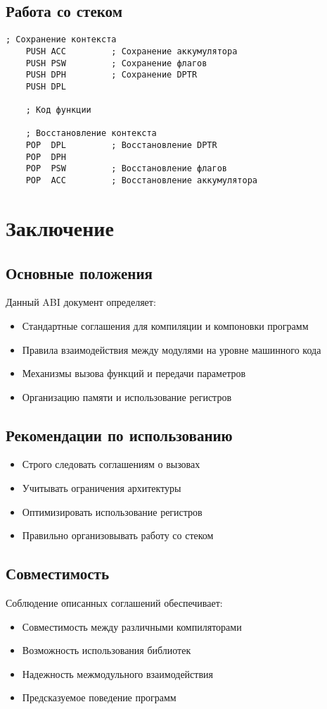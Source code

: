 \documentclass[a4paper, 12pt]{article}
\begin{document}
\subsection{Работа со стеком}
\begin{lstlisting}[language={mc51}]
    ; Сохранение контекста
    PUSH ACC         ; Сохранение аккумулятора
    PUSH PSW         ; Сохранение флагов
    PUSH DPH         ; Сохранение DPTR
    PUSH DPL
    
    ; Код функции
    
    ; Восстановление контекста
    POP  DPL         ; Восстановление DPTR
    POP  DPH
    POP  PSW         ; Восстановление флагов
    POP  ACC         ; Восстановление аккумулятора
\end{lstlisting}

\section{Заключение}
\subsection{Основные положения}
Данный ABI документ определяет:
\begin{itemize}
    \item Стандартные соглашения для компиляции и компоновки программ
    \item Правила взаимодействия между модулями на уровне машинного кода
    \item Механизмы вызова функций и передачи параметров
    \item Организацию памяти и использование регистров
\end{itemize}

\subsection{Рекомендации по использованию}
\begin{itemize}
    \item Строго следовать соглашениям о вызовах
    \item Учитывать ограничения архитектуры
    \item Оптимизировать использование регистров
    \item Правильно организовывать работу со стеком
\end{itemize}

\subsection{Совместимость}
Соблюдение описанных соглашений обеспечивает:
\begin{itemize}
    \item Совместимость между различными компиляторами
    \item Возможность использования библиотек
    \item Надежность межмодульного взаимодействия
    \item Предсказуемое поведение программ
\end{itemize}
\end{document}
